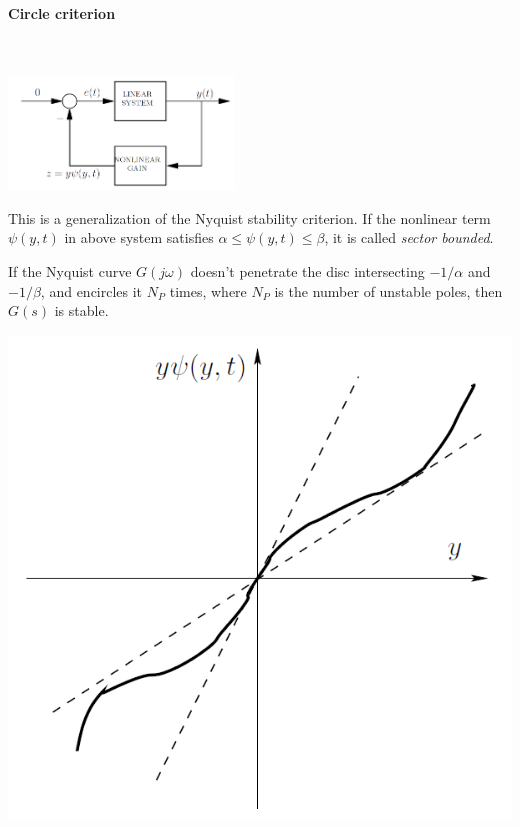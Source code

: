 \paragraph{Circle criterion}~\\
\begin{minipage}{8.5cm}
\begin{center}
    \includegraphics[width=6cm]{bilder/nonlinear_circle_sys.png}
\end{center}
This is a generalization of the Nyquist stability criterion. 
If the nonlinear term $\psi(y,t)$ in above system satisfies $\alpha \leq \psi(y,t) \leq \beta$,
it is called \emph{sector bounded}.

If the Nyquist curve $G(j\omega)$ doesn't penetrate the disc intersecting $-1/\alpha$ and $-1/\beta$,
and encircles it $N_P$ times, where $N_P$ is the number of unstable poles, then
$G(s)$ is stable.
\end{minipage}
\begin{minipage}{5cm}
    \centering
    \includegraphics[width=\linewidth]{bilder/nonlinear_sector.png}
\end{minipage}
